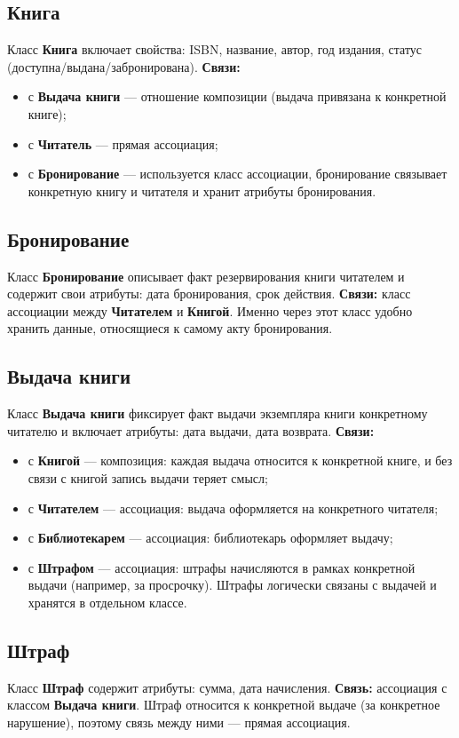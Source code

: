 \documentclass[a4paper,12pt]{article}
\begin{document}
\subsection{Книга}
Класс \textbf{Книга} включает свойства: ISBN, название, автор, год издания, статус (доступна/выдана/забронирована).  
\textbf{Связи:}
\begin{itemize}
    \item с \textbf{Выдача книги} — отношение композиции (выдача привязана к конкретной книге);
    \item с \textbf{Читатель} — прямая ассоциация;
    \item с \textbf{Бронирование} — используется класс ассоциации, бронирование связывает конкретную книгу и читателя и хранит атрибуты бронирования.
\end{itemize}

\subsection{Бронирование}
Класс \textbf{Бронирование} описывает факт резервирования книги читателем и содержит свои атрибуты: дата бронирования, срок действия.  
\textbf{Связи:} класс ассоциации между \textbf{Читателем} и \textbf{Книгой}. Именно через этот класс удобно хранить данные, относящиеся к самому акту бронирования.

\subsection{Выдача книги}
Класс \textbf{Выдача книги} фиксирует факт выдачи экземпляра книги конкретному читателю и включает атрибуты: дата выдачи, дата возврата.  
\textbf{Связи:}
\begin{itemize}
    \item с \textbf{Книгой} — композиция: каждая выдача относится к конкретной книге, и без связи с книгой запись выдачи теряет смысл;
    \item с \textbf{Читателем} — ассоциация: выдача оформляется на конкретного читателя;
    \item с \textbf{Библиотекарем} — ассоциация: библиотекарь оформляет выдачу;
    \item с \textbf{Штрафом} — ассоциация: штрафы начисляются в рамках конкретной выдачи (например, за просрочку). Штрафы логически связаны с выдачей и хранятся в отдельном классе.
\end{itemize}

\subsection{Штраф}
Класс \textbf{Штраф} содержит атрибуты: сумма, дата начисления.  
\textbf{Связь:} ассоциация с классом \textbf{Выдача книги}. Штраф относится к конкретной выдаче (за конкретное нарушение), поэтому связь между ними — прямая ассоциация.
\end{document}
